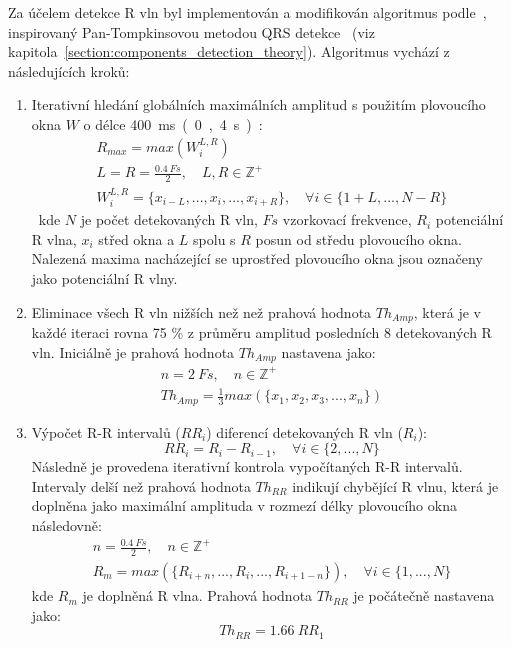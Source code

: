 Za účelem detekce R vln byl implementován a modifikován algoritmus
podle~\cite{Nabian2018}, inspirovaný Pan-Tompkinsovou metodou QRS
detekce~\cite{Pan1985} (viz kapitola~\ref{section:components_detection_theory}).
Algoritmus vychází z následujících kroků:
\begin{enumerate}
    \item Iterativní hledání globálních maximálních amplitud s použitím
          plovoucího okna $W$ o délce 400~\si\ms~(0,4~\si\s):
          \begin{gather}
              R_{max} = max(W_i^{L,R}) \nonumber \\
              L = R = \frac{0.4~Fs}{2}, \quad L,R \in \mathbb{Z^+} \nonumber \\
              W_i^{L,R} = \{x_{i-L},...,x_i,...,x_{i+R}\}, \quad \forall i \in \{1+L,...,N-R\}
          \end{gather}
          kde $N$ je počet detekovaných R vln, $Fs$ vzorkovací frekvence, $R_i$
          potenciální R vlna, $x_i$ střed okna a $L$ spolu s $R$ posun od středu
          plovoucího okna. Nalezená maxima nacházející se uprostřed plovoucího
          okna jsou označeny jako potenciální R vlny.
    \item Eliminace všech R vln nižších než než prahová hodnota $Th_{Amp}$, která je v
          každé iteraci rovna 75 \% z průměru amplitud posledních 8 detekovaných
          R vln. Iniciálně je prahová hodnota $Th_{Amp}$ nastavena jako:
          \begin{gather}
              n = 2~Fs, \quad n \in \mathbb{Z^+} \nonumber \\
              Th_{Amp} = \frac{1}{3} max(\{x_1,x_2,x_3,...,x_n\})
          \end{gather}
    \item Výpočet R-R intervalů ($RR_i$) diferencí detekovaných R vln ($R_i$):
          \begin{equation}
              RR_i = R_{i} - R_{i-1}, \quad \forall i \in \{2,...,N\}
          \end{equation}
          Následně je provedena iterativní kontrola vypočítaných R-R intervalů.
          Intervaly delší než prahová hodnota $Th_{RR}$ indikují chybějící R
          vlnu, která je doplněna jako maximální amplituda v rozmezí délky
          plovoucího okna následovně:
          \begin{gather}
              n = \frac{0.4~Fs}{2}, \quad n \in \mathbb{Z^+} \nonumber \\
              R_m = max(\{R_{i+n},...,R_i,...,R_{i+1-n}\}), \quad \forall i \in \{1,...,N\}
          \end{gather}
          kde $R_m$ je doplněná R vlna. Prahová hodnota $Th_{RR}$ je počátečně
          nastavena jako:
          \begin{equation}
              Th_{RR} = 1.66~RR_1
          \end{equation}
\end{enumerate}

